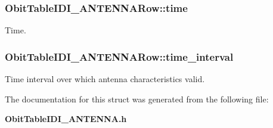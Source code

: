 \subsubsection{ {\bf Obit\-Table\-IDI\_\-ANTENNARow::time}}\label{structObitTableIDI__ANTENNARow_o6}


Time. 

\subsubsection{ {\bf Obit\-Table\-IDI\_\-ANTENNARow::time\_\-interval}}\label{structObitTableIDI__ANTENNARow_o7}


Time interval over which antenna characteristics valid. 



The documentation for this struct was generated from the following file:\begin{CompactItemize}
\item 
{\bf Obit\-Table\-IDI\_\-ANTENNA.h}\end{CompactItemize}
